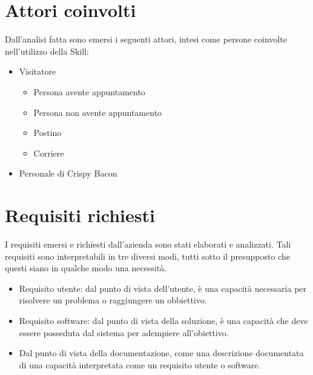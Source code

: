 \section{Attori coinvolti}
Dall'analisi fatta sono emersi i seguenti attori, intesi come persone coinvolte nell'utilizzo della Skill:
\begin{itemize}
    \item Visitatore
        \begin{itemize}
            \item Persona avente appuntamento
            \item Persona non avente appuntamento
            \item Postino
            \item Corriere
        \end{itemize}
    \item Personale di Crispy Bacon
\end{itemize}

\section{Requisiti richiesti}
I requisiti emersi e richiesti dall'azienda sono stati elaborati e analizzati. Tali requisiti sono interpretabili in tre diversi modi, tutti sotto il presupposto che questi siano in qualche modo una necessità.
\begin{itemize}
    \item Requisito utente: dal punto di vista dell'utente, è una capacità necessaria per risolvere un problema o raggiungere un obbiettivo.
    \item Requisito software: dal punto di vista della soluzione, è una capacità che deve essere posseduta dal sistema per adempiere all'obiettivo.
    \item Dal punto di vista della documentazione, come una descrizione documentata di una capacità interpretata come un requisito utente o software.
\end{itemize}
